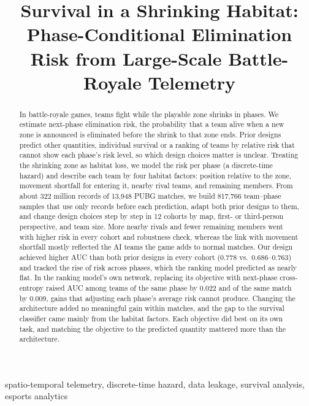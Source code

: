 \documentclass[conference]{IEEEtran}
\begin{document}

\title{Survival in a Shrinking Habitat: Phase-Conditional Elimination Risk from Large-Scale Battle-Royale Telemetry}
\author{}
\maketitle

\begin{abstract}
In battle-royale games, teams fight while the playable zone shrinks in phases.
We estimate next-phase elimination risk, the probability that a team alive when a new zone is announced is eliminated before the shrink to that zone ends.
Prior designs predict other quantities, individual survival or a ranking of teams by relative risk that cannot show each phase's risk level, so which design choices matter is unclear.
Treating the shrinking zone as habitat loss, we model the risk per phase (a discrete-time hazard) and describe each team by four habitat factors: position relative to the zone, movement shortfall for entering it, nearby rival teams, and remaining members.
From about 322 million records of 13,948 PUBG matches, we build 817,766 team--phase samples that use only records before each prediction, adapt both prior designs to them, and change design choices step by step in 12 cohorts by map, first- or third-person perspective, and team size.
More nearby rivals and fewer remaining members went with higher risk in every cohort and robustness check, whereas the link with movement shortfall mostly reflected the AI teams the game adds to normal matches.
Our design achieved higher AUC than both prior designs in every cohort (0.778 vs.\ 0.686--0.763) and tracked the rise of risk across phases, which the ranking model predicted as nearly flat.
In the ranking model's own network, replacing its objective with next-phase cross-entropy raised AUC among teams of the same phase by 0.022 and of the same match by 0.009, gains that adjusting each phase's average risk cannot produce.
Changing the architecture added no meaningful gain within matches, and the gap to the survival classifier came mainly from the habitat factors.
Each objective did best on its own task, and matching the objective to the predicted quantity mattered more than the architecture.
\end{abstract}

\begin{IEEEkeywords}
spatio-temporal telemetry, discrete-time hazard, data leakage, survival analysis, esports analytics
\end{IEEEkeywords}
\end{document}
